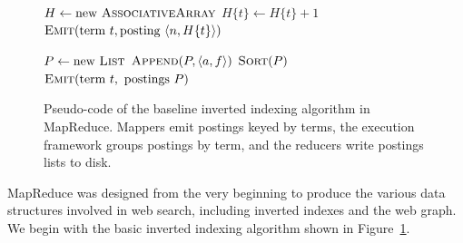 \begin{figure}[t]
\algrenewcommand{}
  \begin{algorithmic}[1]
    \State $H \gets \textrm{new }\textsc{AssociativeArray}$
    \State $H\{t\} \gets H\{t\} + 1$
    \EndFor
    \State $\textsc{Emit}(\textrm{term }t, \textrm{posting }\langle n, H\{t\} \rangle )$
    \EndFor
    \EndProcedure
    \EndFunction
  \end{algorithmic}

  \begin{algorithmic}[1]
    \State $P \gets \textrm{new }\textsc{List}$
    \State $\textsc{Append}(P, \langle a, f \rangle )$
    \EndFor
    \State $\textsc{Sort}(P)$
    \State $\textsc{Emit}(\textrm{term }t, \textrm{ postings } P)$
    \EndProcedure
    \EndFunction
  \end{algorithmic}
  \caption{Pseudo-code of the baseline inverted indexing algorithm in
    MapReduce.  Mappers emit postings keyed by terms, the execution
    framework groups postings by term, and the reducers write postings
    lists to disk.}
\label{chapter-indexing:indexing:basic}
\end{figure}

MapReduce was designed from the very beginning to produce the various
data structures involved in web search, including inverted indexes and
the web graph.  We begin with the basic inverted indexing algorithm 
shown in Figure~\ref{chapter-indexing:indexing:basic}.

